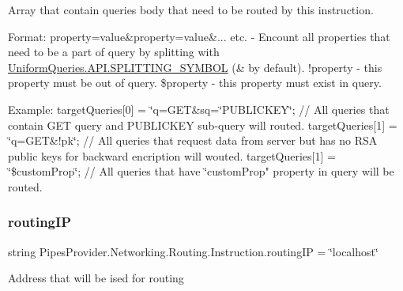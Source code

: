 Array that contain querie\textquotesingle{}s body that need to be routed by this instruction. 

Format\+: property=value\&property=value\&... etc. -\/ Encount all properties that need to be a part of query by splitting with \mbox{\hyperlink{class_uniform_queries_1_1_a_p_i_aa906970223172f9f2068baa410b621d8}{Uniform\+Queries.\+A\+P\+I.\+S\+P\+L\+I\+T\+T\+I\+N\+G\+\_\+\+S\+Y\+M\+B\+OL}} (\textquotesingle{}\&\textquotesingle{} by default). !property -\/ this property must be out of query. \$property -\/ this property must exist in query.

Example\+: target\+Queries\mbox{[}0\mbox{]} = \char`\"{}q=\+G\+E\+T\&sq=\char`\"{}P\+U\+B\+L\+I\+C\+K\+EY\char`\"{};   // All queries that contain G\+E\+T query and P\+U\+B\+L\+I\+C\+K\+E\+Y sub-\/query will routed.
target\+Queries\mbox{[}1\mbox{]} = \char`\"{}q=G\+ET\&!pk\char`\"{};             // All queries that request data from server but has no R\+S\+A public keys for backward encription will wouted.
target\+Queries\mbox{[}1\mbox{]} = \char`\"{}\$custom\+Prop\char`\"{};           // All queries that have \char`\"{}custom\+Prop" property in query will be routed. \mbox{\label{class_pipes_provider_1_1_networking_1_1_routing_1_1_instruction_adb75f80ff34fab644305856ccf23d07b}} 
\subsubsection{\texorpdfstring{routing\+IP}{routingIP}}
{\footnotesize\ttfamily string Pipes\+Provider.\+Networking.\+Routing.\+Instruction.\+routing\+IP = \char`\"{}localhost\char`\"{}}



Address that will be ised for routing 

\mbox{\label{class_pipes_provider_1_1_networking_1_1_routing_1_1_instruction_a61ce6ffa8bb9cc44efc57bc51be3550b}} 
